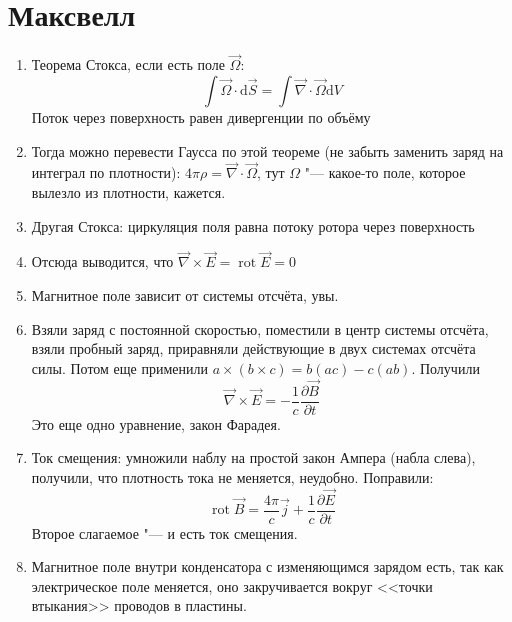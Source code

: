 \documentclass[10pt,a4paper]{article}
\renewcommand{\d}{\mathrm{d}}
\DeclareMathOperator{\rot}{rot}
\begin{document}
\section{Максвелл}
\begin{enumerate}
\item Теорема Стокса, если есть поле $\vec \Omega$:
\[ \int \vec \Omega \cdot \d \vec S = \int \vec \nabla \cdot \vec \Omega \d V \]
Поток через поверхность равен дивергенции по объёму
\item Тогда можно перевести Гаусса по этой теореме (не забыть заменить заряд на интеграл по плотности): $4\pi \rho = \vec\nabla \cdot \vec \Omega$, тут $\Omega$ "--- какое-то поле, которое вылезло из плотности, кажется.
\item Другая Стокса: циркуляция поля равна потоку ротора через поверхность
\item Отсюда выводится, что $\vec \nabla \times \vec E = \rot \vec E = 0$
\item Магнитное поле зависит от системы отсчёта, увы.
\item Взяли заряд с постоянной скоростью, поместили в центр системы отсчёта, взяли пробный заряд, приравняли действующие в двух системах отсчёта силы.
Потом еще применили $a \times (b \times c) = b(ac)-c(ab)$.
Получили
\[ \vec \nabla \times \vec E = -\frac1c \frac{\partial \vec B}{\partial t} \]
Это еще одно уравнение, закон Фарадея.
\item Ток смещения: умножили наблу на простой закон Ампера (набла слева), получили, что плотность тока не меняется, неудобно.
Поправили:
\[ \rot \vec B = \frac{4\pi}{c} \vec j + \frac{1}{c} \frac{\partial \vec E}{\partial t} \]
Второе слагаемое "--- и есть ток смещения.
\item Магнитное поле внутри конденсатора с изменяющимся зарядом есть, так как электрическое поле меняется, оно закручивается вокруг <<точки втыкания>> проводов в пластины.
\end{enumerate}
\end{document}
